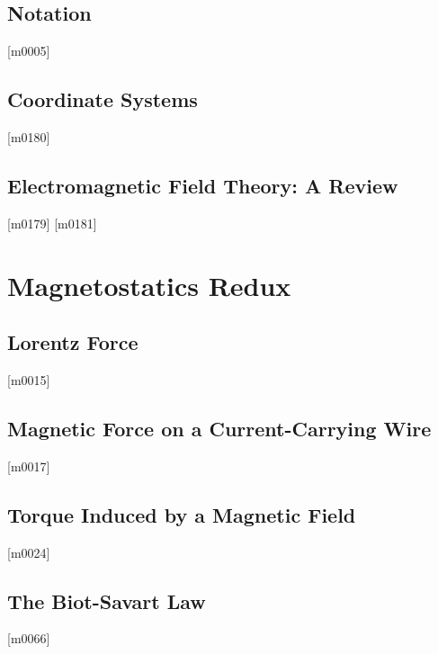 \documentclass[10pt,letterpaper,twocolumn,openany]{book}
\theoremstyle{definition} %
\begin{document}
    \section{Notation}
{\color{blue}\tiny[m0005]}      
      \vfill\break
    \section{Coordinate Systems}
{\color{blue}\tiny[m0180]}      
      \vfill\break
    \section{Electromagnetic Field Theory: A Review}
{\color{blue}\tiny[m0179]}      
      \vfill\break
{\color{blue}\tiny[m0181]}    
  \chapter{Magnetostatics Redux}
  \thispagestyle{fancy} %
  \fancyhf{}            %
    \section{Lorentz Force}
{\color{blue}\tiny[m0015]}      
      \vfill\break
    \section{Magnetic Force on a Current-Carrying Wire}
{\color{blue}\tiny[m0017]}      
      \vfill\break
    \section{Torque Induced by a Magnetic Field}
{\color{blue}\tiny[m0024]}      
      \vfill\break
    \section{The Biot-Savart Law}
{\color{blue}\tiny[m0066]}      
      \vfill\break
\end{document}
